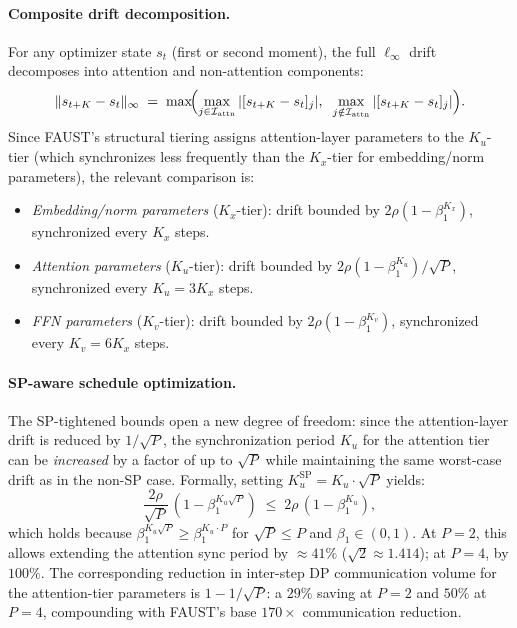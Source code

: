 \documentclass{article}
\begin{document}
\paragraph{Composite drift decomposition.}
For any optimizer state $s_t$ (first or second moment), the full
$\ell_\infty$ drift decomposes into attention and non-attention components:
\begin{equation}
\|s_{t+K} - s_t\|_\infty
\;=\; \max\!\Bigl(
  \max_{j \in \mathcal{I}_{\text{attn}}} |[s_{t+K} - s_t]_j|,\;\;
  \max_{j \notin \mathcal{I}_{\text{attn}}} |[s_{t+K} - s_t]_j|
\Bigr).
\label{eq:drift_composite}
\end{equation}
Since FAUST's structural tiering assigns attention-layer parameters to the
$K_u$-tier (which synchronizes less frequently than the $K_x$-tier for
embedding/norm parameters), the relevant comparison is:
\begin{itemize}
\item \emph{Embedding/norm parameters} ($K_x$-tier): drift bounded by
      $2\rho(1-\beta_1^{K_x})$, synchronized every $K_x$ steps.
\item \emph{Attention parameters} ($K_u$-tier): drift bounded by
      $2\rho(1-\beta_1^{K_u})/\sqrt{P}$, synchronized every $K_u = 3K_x$ steps.
\item \emph{FFN parameters} ($K_v$-tier): drift bounded by
      $2\rho(1-\beta_1^{K_v})$, synchronized every $K_v = 6K_x$ steps.
\end{itemize}

\paragraph{SP-aware schedule optimization.}
The SP-tightened bounds open a new degree of freedom: since the
attention-layer drift is reduced by $1/\sqrt{P}$, the synchronization
period $K_u$ for the attention tier can be \emph{increased} by a factor
of up to $\sqrt{P}$ while maintaining the same worst-case drift as in
the non-SP case. Formally, setting $K_u^{\text{SP}} = K_u \cdot \sqrt{P}$
yields:
\begin{equation}
\frac{2\rho}{\sqrt{P}}\,(1 - \beta_1^{K_u \sqrt{P}})
\;\leq\; 2\rho\,(1 - \beta_1^{K_u}),
\label{eq:sp_schedule_extension}
\end{equation}
which holds because $\beta_1^{K_u\sqrt{P}} \geq \beta_1^{K_u\cdot P}$
for $\sqrt{P} \leq P$ and $\beta_1 \in (0,1)$.
At $P = 2$, this allows extending the attention sync period by $\approx 41\%$
($\sqrt{2} \approx 1.414$); at $P = 4$, by $100\%$.
The corresponding reduction in inter-step DP communication volume for the
attention-tier parameters is $1 - 1/\sqrt{P}$: a $29\%$ saving at $P = 2$
and $50\%$ at $P = 4$, compounding with FAUST's base $170\times$
communication reduction.
\end{document}

